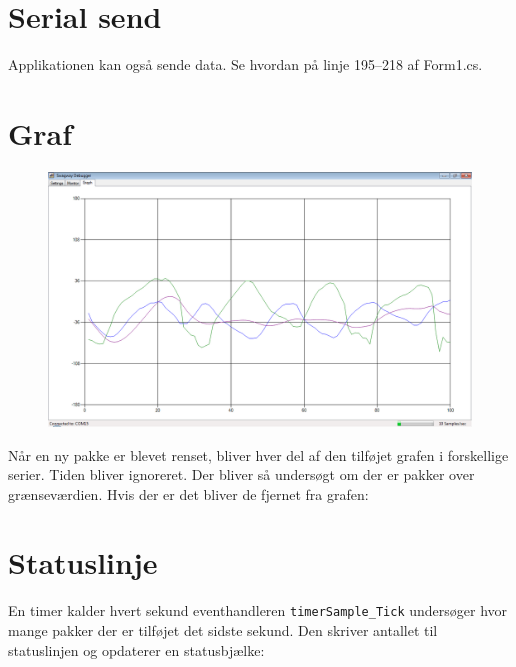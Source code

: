\documentclass[a4paper,oneside,article,danish,table]{memoir}
\newcommand{\form}[2]{}
\begin{document}
\section{Serial send}
Applikationen kan også sende data. Se hvordan på linje 195--218 af Form1.cs.

\section{Graf}
\begin{figure}[htbp]
  \centering
  \includegraphics[width=1\textwidth]{graph.png}
\end{figure}
Når en ny pakke er blevet renset, bliver hver del af den tilføjet grafen i forskellige serier. Tiden bliver ignoreret. Der bliver så undersøgt om der er pakker over grænseværdien. Hvis der er det bliver de fjernet fra grafen:
\form{224}{239}

\section{Statuslinje}
En timer kalder hvert sekund eventhandleren \texttt{timerSample\_Tick} undersøger hvor mange pakker der er tilføjet det sidste sekund. Den skriver antallet til statuslinjen og opdaterer en statusbjælke:
\form{245}{258}
\end{document}
